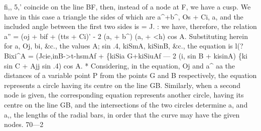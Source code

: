 \documentclass[12pt,a4paper]{article}
\begin{document}
fi,,
5,' coincide on
the
line BF, then,
instead
of a node at
F, we have
a cusp.
We
have
in this
case
a
triangle
the
sides
of which
are a\textasciicircum{}+b\textasciicircum{},
Os + Ci,
a, and
the included angle between the
first two
sides
is = J.
: we have,
therefore, the relation
a'' = (oj + bif + (tts + Ci)' - 2 (a, + b\textasciicircum{}) (a, + <h) cos A.
Substituting
herein
for
a,
Oj,
bi,
\&c.,
the
values
A; sin .4,
kiSmA,
kiSinB,
\&c.,
the
equation
is
l(?Bixi\textasciicircum{}A = (Jcie,inB->t-hsmAf + \{kiSia G+kiSiuAf
--- 2 (i, sin B + kisinA) \{ki sin C + Ajj sin .4) cos A.
*
Considering,
in
the
equation,
Oj and
a\textasciicircum{} aa the distances of
a variable point P from the points G and B
respectively,
the
equation
represents
a
circle
having
its
centre
on
the
line
GB.
Similarly,
when
a
second
node
is
given,
the
corresponding
equation
represents
another
circle,
having
its
centre
on
the
line
GB,
and
the
intersections
of
the
two
circles
determine
a, and
a,,
the
lengths
of
the
radial
bars,
in
order
that
the
curve may have the given nodes.
70---2
\end{document}
